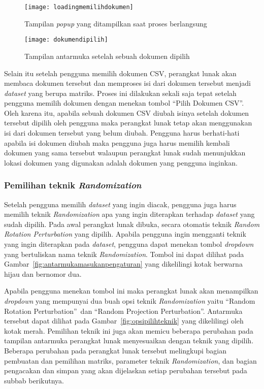 \begin{figure}
	\centering
	\texttt{[image: loadingmemilihdokumen]}
	\caption{Tampilan \textit{popup} yang ditampilkan saat proses berlangsung}
	\label{fig:loadingmemilihdokumen}
\end{figure}

\begin{figure}
	\centering
	\texttt{[image: dokumendipilih]}
	\caption{Tampilan antarmuka setelah sebuah dokumen dipilih}
	\label{fig:dokumendipilih}
\end{figure}

Selain itu setelah pengguna memilih dokumen CSV, perangkat lunak akan membaca dokumen tersebut dan memproses isi dari dokumen tersebut menjadi \textit{dataset} yang berupa matriks. Proses ini dilakukan sekali saja tepat setelah pengguna memilih dokumen dengan menekan tombol \textquotedblleft Pilih Dokumen CSV\textquotedblright. Oleh karena itu, apabila sebuah dokumen CSV diubah isinya setelah dokumen tersebut dipilih oleh pengguna maka perangkat lunak tetap akan menggunakan isi dari dokumen tersebut yang belum diubah. Pengguna harus berhati-hati apabila isi dokumen diubah maka pengguna juga harus memilih kembali dokumen yang sama tersebut walaupun perangkat lunak sudah menunjukkan lokasi dokumen yang digunakan adalah dokumen yang pengguna inginkan.

\subsubsection{Pemilihan teknik \textit{Randomization}}
\label{subsubsec:pilihteknik}

Setelah pengguna memilih \textit{dataset} yang ingin diacak, pengguna juga harus memilih teknik \textit{Randomization} apa yang ingin diterapkan terhadap \textit{dataset} yang sudah dipilih. Pada awal perangkat lunak dibuka, secara otomatis teknik \textit{Random Rotation Perturbation} yang dipilih. Apabila pengguna ingin mengganti teknik yang ingin diterapkan pada \textit{dataset}, pengguna dapat menekan tombol \textit{dropdown} yang bertuliskan nama teknik \textit{Randomization}. Tombol ini dapat dilihat pada Gambar~\ref{fig:antarmukamasukanpengaturan} yang dikelilingi kotak berwarna hijau dan bernomor dua.

Apabila pengguna menekan tombol ini maka perangkat lunak akan menampilkan \textit{dropdown} yang mempunyai dua buah opsi teknik \textit{Randomization} yaitu \textquotedblleft Random Rotation Perturbation\textquotedblright~dan \textquotedblleft Random Projection Perturbation\textquotedblright. Antarmuka tersebut dapat dilihat pada Gambar~\ref{fig:opsipilihteknik} yang dikelilingi oleh kotak merah. Pemilihan teknik ini juga akan memicu beberapa perubahan pada tampilan antarmuka perangkat lunak menyesuaikan dengan teknik yang dipilih. Beberapa perubahan pada perangkat lunak tersebut melingkupi bagian pembuatan dan pemilihan matriks, parameter teknik \textit{Randomization}, dan bagian pengacakan dan simpan yang akan dijelaskan setiap perubahan tersebut pada subbab berikutnya.

